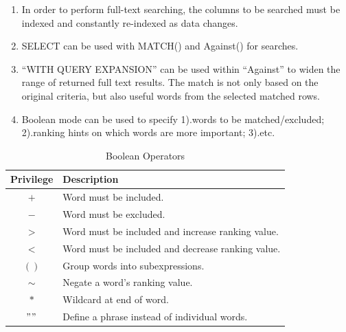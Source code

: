 \documentclass[12pt,oneside,a4paper]{article}
\begin{document}
\begin{enumerate}
\item In order to perform full-text searching, the columns to be searched must be indexed and constantly re-indexed as data changes. 

\item \textsf{SELECT} can be used with \textsf{MATCH()} and \textsf{Against()} for searches. 

\item ``WITH QUERY EXPANSION'' can be used within ``Against'' to widen the range of returned full text results. The match is not only based on the original criteria, but also useful words from the selected matched rows. 

\item Boolean mode can be used to specify 1).words to be matched/excluded; 2).ranking hints on which words are more important; 3).etc.
\end{enumerate}

\begin{table}[h]
	\centering
	\begin{tabular}{ |c|l|} 
		\hline
		Privilege & Description\\ 
		\hline
		$+$ & Word must be included. \\ 
		\hline
		$-$ & Word must be excluded. \\ 
		\hline
		$>$ & Word must be included and increase ranking value. \\
		\hline
		$<$ & Word must be included and decrease ranking value. \\
		\hline
		$()$ & Group words into subexpressions. \\  
		\hline
		$\sim$ & Negate a word's ranking value. \\  
		\hline
		$*$ & Wildcard at end of word. \\ 
		\hline
		$" "$ & Define a phrase instead of individual words. \\ 

		\hline
	\end{tabular}
	\caption{Boolean Operators}
\end{table}
\end{document}
